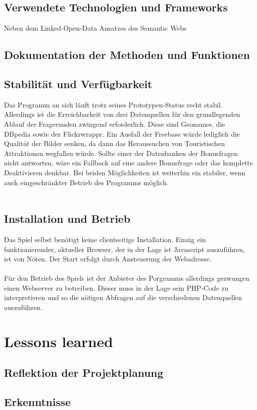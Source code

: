 \documentclass[a4paper, 11pt]{article}
\begin{document}
\subsection{Verwendete Technologien und Frameworks}
Neben dem Linked-Open-Data Ansatzes des Semantic Webs
\subsection{Dokumentation der Methoden und Funktionen}
\subsection{Stabilität und Verfügbarkeit}
Das Programm an sich läuft trotz seines Prototypen-Status recht stabil. Allerdings ist die Erreichbarkeit von drei Datenquellen für den grundlegenden Ablauf der Fragerunden zwingend erforderlich. Diese sind Geonames, die DBpedia sowie der Flickrwrappr. Ein Ausfall der Freebase würde lediglich die Qualität der Bilder senken, da dann das Heraussuchen von Touristischen Attraktionen wegfallen würde. Sollte einer der Datenbanken der Bonusfragen nicht antworten, wäre ein Fallback auf eine andere Bonusfrage oder das komplette Deaktivieren denkbar. Bei beiden Möglichkeiten ist weiterhin ein stabiler, wenn auch eingeschränkter Betrieb des Programms möglich.\\\\
\subsection{Installation und Betrieb}
Das Spiel selbst benötigt keine clientseitige Installation. Einzig ein funktionierender, aktueller Browser, der in der Lage ist Javascript auszuführen, ist von Nöten. Der Start erfolgt durch Ansteuerung der Webadresse.\\\\Für den Betrieb des Spiels ist der Anbieter des Porgramms allerdings gezwungen einen Webserver zu betreiben. Dieser muss in der Lage sein PHP-Code zu interpretieren und so die nötigen Abfragen auf die verschiedenen Datenquellen auszuführen.
\newpage
\section{Lessons learned}
\subsection{Reflektion der Projektplanung}
\subsection{Erkenntnisse}
\end{document}
